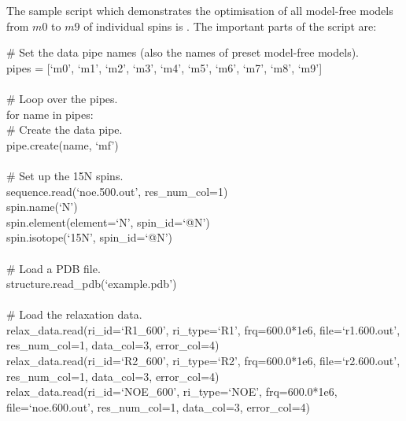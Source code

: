 \begin{htmlonly}
\begin{htmlonly}
The sample script which demonstrates the optimisation of all model-free models from $m0$ to $m9$ of individual spins is .  The important parts of the script are:

\begin{exampleenv}
\# Set the data pipe names (also the names of preset model-free models). \\
pipes = [`m0', `m1', `m2', `m3', `m4', `m5', `m6', `m7', `m8', `m9'] \\
 \\
\# Loop over the pipes. \\
for name in pipes: \\
\hspace*{4ex} \# Create the data pipe. \\
\hspace*{4ex} pipe.create(name, `mf') \\
 \\
\hspace*{4ex} \# Set up the 15N spins. \\
\hspace*{4ex} sequence.read(`noe.500.out', res\_num\_col=1) \\
\hspace*{4ex} spin.name(`N') \\
\hspace*{4ex} spin.element(element=`N', spin\_id=`@N') \\
\hspace*{4ex} spin.isotope(`15N', spin\_id=`@N') \\
 \\
\hspace*{4ex} \# Load a PDB file. \\
\hspace*{4ex} structure.read\_pdb(`example.pdb') \\
 \\
\hspace*{4ex} \# Load the relaxation data. \\
\hspace*{4ex} relax\_data.read(ri\_id=`R1\_600',  ri\_type=`R1',  frq=600.0*1e6, file=`r1.600.out', res\_num\_col=1, data\_col=3, error\_col=4) \\
\hspace*{4ex} relax\_data.read(ri\_id=`R2\_600',  ri\_type=`R2',  frq=600.0*1e6, file=`r2.600.out', res\_num\_col=1, data\_col=3, error\_col=4) \\
\hspace*{4ex} relax\_data.read(ri\_id=`NOE\_600', ri\_type=`NOE', frq=600.0*1e6, file=`noe.600.out', res\_num\_col=1, data\_col=3, error\_col=4) \\

\end{exampleenv}
\end{htmlonly}
\end{htmlonly}

